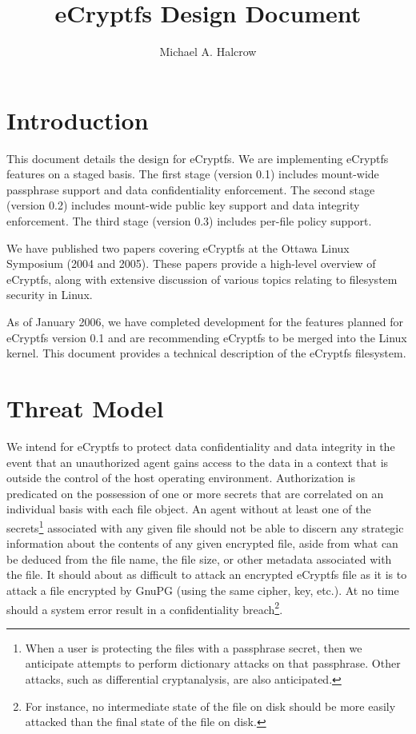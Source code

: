 \documentclass{article}
\begin{document}
\title{eCryptfs Design Document}

\author{Michael A. Halcrow}

\maketitle

\section*{Introduction}

This document details the design for eCryptfs. We are implementing
eCryptfs features on a staged basis. The first stage (version 0.1)
includes mount-wide passphrase support and data confidentiality
enforcement. The second stage (version 0.2) includes mount-wide public
key support and data integrity enforcement. The third stage (version
0.3) includes per-file policy support.

We have published two papers covering eCryptfs at the Ottawa Linux
Symposium (2004 and 2005).\cite{ols} These papers provide a high-level
overview of eCryptfs, along with extensive discussion of various
topics relating to filesystem security in Linux.

As of January 2006, we have completed development for the features
planned for eCryptfs version 0.1 and are recommending eCryptfs to be
merged into the Linux kernel. This document provides a technical
description of the eCryptfs filesystem.

\section*{Threat Model}

We intend for eCryptfs to protect data confidentiality and data
integrity in the event that an unauthorized agent gains access to the
data in a context that is outside the control of the host operating
environment. Authorization is predicated on the possession of one or
more secrets that are correlated on an individual basis with each file
object. An agent without at least one of the secrets\footnote{When a
user is protecting the files with a passphrase secret, then we
anticipate attempts to perform dictionary attacks on that
passphrase. Other attacks, such as differential cryptanalysis, are
also anticipated.} associated with any given file should not be able
to discern any strategic information about the contents of any given
encrypted file, aside from what can be deduced from the file name, the
file size, or other metadata associated with the file. It should about
as difficult to attack an encrypted eCryptfs file as it is to attack a
file encrypted by GnuPG (using the same cipher, key, etc.). At no time
should a system error result in a confidentiality breach\footnote{For
instance, no intermediate state of the file on disk should be more
easily attacked than the final state of the file on disk.}.
\end{document}

